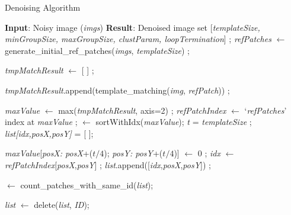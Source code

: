 \documentclass[fleqn,10pt]{wlscirep}
\begin{document}
	\begin{algorithm}
		\caption{Denoising Algorithm}
		\label{algorithm:denoising_algorithm}
		\begin{algorithmic}[1]
			\State \textbf{Input}: Noisy image (\textit{imgs})
			\State \textbf{Result}: Denoised image
			\State set [\textit{templateSize, minGroupSize, maxGroupSize, clustParam, loopTermination}] ;
			\State \textit{refPatches} $\gets$ generate\_initial\_ref\_patches(\textit{imgs}, \textit{templateSize}) ;
			
			
			\State \textit{tmpMatchResult} $\gets$ [ ]	;		
			
			
			\State \textit{tmpMatchResult}.append(template\_matching(\textit{img}, \textit{refPatch})) ;
			
			\EndFor
			\EndFor
			
			\State \textit{maxValue} $\gets$ max(\textit{tmpMatchResult}, axis=2) ;
			\State \textit{refPatchIndex} $\gets$ `\textit{refPatches}' index at \textit{maxValue} ;
			 $\gets$ sortWithIdx(\textit{maxValue}); 
			\State \textit{t} = \textit{templateSize} ;
			\State \textit{list[\textit{idx},\textit{posX},\textit{posY}]} = [ ];
				
				\State \textit{maxValue}[\textit{posX: posX}+($t/4$); \textit{posY: posY}+($t/4$)] $\gets$ 0 ;
				\State \textit{idx} $\gets$ \textit{refPatchIndex}[\textit{posX},\textit{posY}] ;
				\State \textit{list}.append([\textit{idx},\textit{posX},\textit{posY}]) ;
				\EndIf
				\EndFor
				
				 $\gets$ count\_patches\_with\_same\_id(\textit{list});
				
				\State \textit{list} $\gets$ delete(\textit{list}, \textit{ID});
				

\end{algorithmic}
\end{algorithm}
\end{document}
